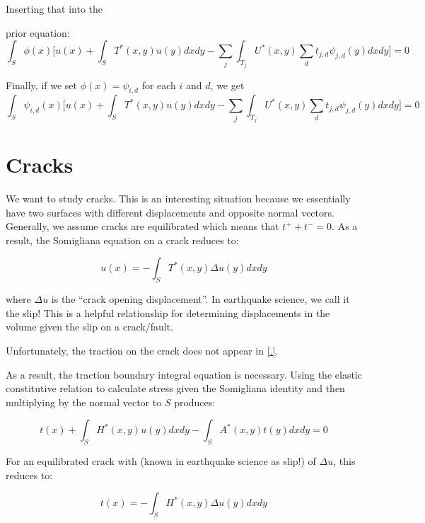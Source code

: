 \documentclass{article}
\begin{document}
Inserting that into the{prior equation:
\begin{equation}
    \int_{S} \phi(x) \Big[ u(x) +
    \int_{S} T^*(x,y) u(y) dx dy -
\sum_{j} \int_{T_j} U^*(x,y) \sum_{d} t_{j,d} \psi_{j,d}(y) dx dy \Big] = 0
\end{equation}

Finally, if we set $\phi(x) = \psi_{i,d}$ for each $i$ and $d$, we get
\begin{equation}
    \int_{S} \psi_{i,d}(x) \Big[ u(x) +
    \int_{S} T^*(x,y) u(y) dx dy -
\sum_{j} \int_{T_j} U^*(x,y) \sum_{d} t_{j,d} \psi_{j,d}(y) dx dy \Big] = 0
\end{equation}

\section{Cracks}

We want to study cracks. This is an interesting situation because we essentially have two surfaces with different displacements and opposite normal vectors. Generally, we assume cracks are equilibrated which means that $t^+ + t^- = 0$. As a result, the Somigliana equation on a crack reduces to:

\begin{equation}
    u(x) = -\int_{S} T^*(x,y) \Delta u(y) dx dy
\end{equation}

where $\Delta u$ is the ``crack opening displacement''. In earthquake science, we call it the slip! This is a helpful relationship for determining displacements in the volume given the slip on a crack/fault.

Unfortunately, the traction on the crack does not appear in \ref{.}. 

As a result, the traction boundary integral equation is necessary. Using the elastic constitutive relation to calculate stress given the Somigliana identity and then multiplying by the normal vector to $S$ produces:

\begin{equation}
    t(x) +
    \int_{S} H^*(x,y) u(y) dx dy -
    \int_{S} A^*(x,y) t(y) dx dy = 0
\end{equation}

For an equilibrated crack  with  (known in earthquake science as slip!) of $\Delta u$, this reduces to:

\begin{equation}
    t(x) = -\int_{S} H^*(x,y) \Delta u(y) dx dy
\end{equation}

}
\end{document}

